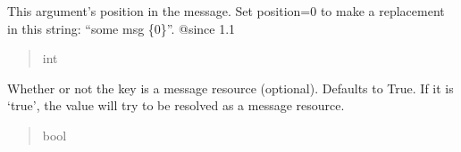\documentclass[letterpaper,10pt,english]{sphinxmanual}
\begin{document}
\begin{fulllineitems}
\begin{fulllineitems}
\begin{quote}
\begin{description}
\end{description}\end{quote}

\end{fulllineitems}


\begin{fulllineitems}
\label{\detokenize{apache_commons_validator_python:apache_commons_validator_python.arg_new.Arg.position}}
\pysigstartsignatures
{}
\pysigstopsignatures
\sphinxAtStartPar
This argument’s position in the message. Set position=0 to make a replacement in this string: “some msg \{0\}”. @since 1.1
\begin{quote}\begin{description}
\sphinxAtStartPar
int

\end{description}\end{quote}

\end{fulllineitems}


\begin{fulllineitems}
\label{\detokenize{apache_commons_validator_python:apache_commons_validator_python.arg_new.Arg.resource}}
\pysigstartsignatures
{}
\pysigstopsignatures
\sphinxAtStartPar
Whether or not the key is a message resource (optional). Defaults to True. If it is ‘true’, the value will try to be resolved as a message resource.
\begin{quote}\begin{description}
\sphinxAtStartPar
bool

\end{description}\end{quote}

\end{fulllineitems}



\end{fulllineitems}
\end{document}

